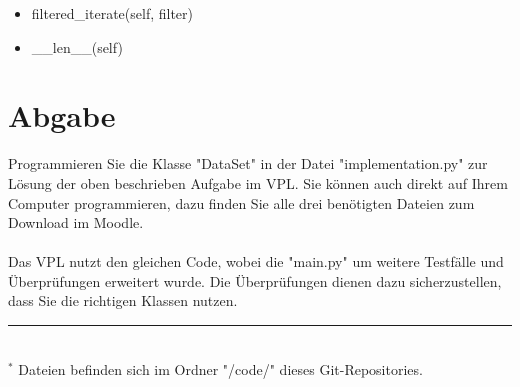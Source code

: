 \documentclass[]{article}
\begin{document}
\begin{itemize}
	\item filtered\_iterate(self, filter)
	\item \_\_len\_\_(self)

\end{itemize}
\section{Abgabe}
Programmieren Sie die Klasse "DataSet" in der Datei "implementation.py" zur Lösung der oben beschrieben Aufgabe im VPL.
Sie können auch direkt auf Ihrem Computer programmieren, dazu finden Sie alle drei benötigten Dateien zum Download im Moodle.\\
\\
Das VPL nutzt den gleichen Code, wobei die "main.py" um weitere Testfälle und Überprüfungen erweitert wurde.
Die Überprüfungen dienen dazu sicherzustellen, dass Sie die richtigen Klassen nutzen.\\
%
\hrule\hfill\\[0.2cm]
$^*$ Dateien befinden sich im Ordner "/code/" dieses Git-Repositories.\\
\end{document}
